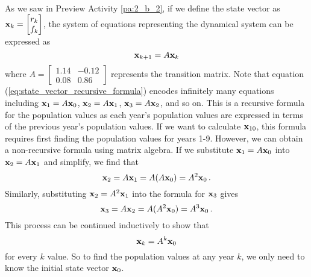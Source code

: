 As we saw in Preview Activity \ref{pa:2_b_2}, if we define the state vector as $\mathbf{x}_k=\begin{bmatrix} r_k \\ f_k \end{bmatrix}$, the system of equations representing the dynamical system can be expressed as  
\begin{equation} 
\mathbf{x}_{k+1} = A \mathbf{x}_k \label{eq:state_vector_recursive_formula}
\end{equation}
where $A=\left[ \begin{array}{cr} 1.14 & -0.12 \\ 0.08 & 0.86 \end{array} \right]$ represents the transition matrix. Note that equation (\ref{eq:state_vector_recursive_formula}) encodes infinitely many equations including $\mathbf{x}_1 = A\mathbf{x}_0$, $\mathbf{x}_2=A\mathbf{x}_1$, $\mathbf{x}_3=A\mathbf{x}_2$, and so on. This is a recursive formula for the population values as each year's population values are expressed in terms of the previous year's population values. If we want to calculate $\mathbf{x}_{10}$, this formula requires first finding the population values for years 1-9. However, we can obtain a non-recursive formula using matrix algebra. If we substitute $\mathbf{x}_1 = A\mathbf{x}_0$ into $\mathbf{x}_2=A\mathbf{x}_1$ and simplify, we find that 
\[ \mathbf{x}_2=A\mathbf{x}_1= A(A\mathbf{x}_0) = A^2 \mathbf{x}_0 \,.\] 
Similarly, substituting $\mathbf{x}_2=A^2\mathbf{x}_1$ into the formula for $\mathbf{x}_3$ gives
\[ \mathbf{x}_3 = A\mathbf{x}_2=A(A^2 \mathbf{x}_0) = A^3 \mathbf{x}_0 \, .\]
This process can be continued inductively to show that 
\begin{equation}
\mathbf{x}_k=A^k \mathbf{x}_0 \label{eq:state_vector_closed_formula}
\end{equation}
for every $k$ value. So to find the population values at any year $k$, we only need to know the initial state vector $\mathbf{x}_0$.



